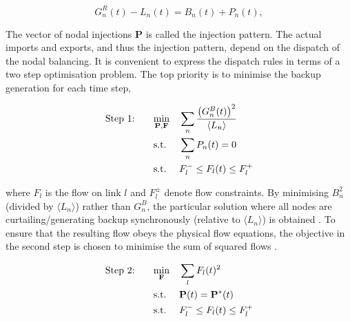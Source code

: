 \documentclass[a4paper, 5p, sort&compress]{elsarticle}%
\newcommand{\mean}[1]{\langle #1 \rangle}
\newcommand{\paren}[1]{\left(#1\right)}
\begin{document}
\begin{equation}
  \label{eq:nodal-balancing}
  G^{R}_{n}(t) - L_{n}(t) = B_{n}(t) + P_{n}(t), %
\end{equation}

The vector of nodal injections $\mathbf{P}$ is called the injection
pattern. The actual imports and exports, and thus the injection
pattern, depend on the dispatch of the nodal balancing. It is
convenient to express the dispatch rules in terms of a two step
optimisation problem. The top priority is to minimise the backup
generation for each time step,

\begin{equation}
  \label{eq:step1}
  \begin{aligned}
    \text{Step 1: \hspace{15pt}}& \underset{\mathbf{P}, \mathbf{F}}{\text{min}}
    & & \sum_{n} \frac{\paren{G_{n}^{B}(t)}^{2}}{\mean{L_{n}}} \\
    & \text{s.t.}
    & & \sum_{n} P_{n} (t) = 0 \\ %
    & \text{s.t.}
    & & F_{l}^{-} \leq F_{l} (t) \leq F_{l}^{+}
  \end{aligned}
\end{equation}

where $F_{l}$ is the flow on link $l$ and $F_{l}^{\pm}$ denote flow
constraints. By minimising $B_{n}^{2}$ (divided by $\mean{L_{n}}$)
rather than $G_{n}^{B}$, the particular solution where all nodes are
curtailing/generating backup synchronously (relative to
$\mean{L_{n}}$) is obtained
\cite{Rolando2015}. %
To ensure that the resulting flow obeys the physical flow equations, the
objective in the second step is chosen to minimise the sum of squared flows
\cite{Magnus}.

\begin{equation}
  \begin{aligned}
    \label{eq:step2}
    \text{Step 2: \hspace{15pt}} & \underset{\mathbf{F}}{\text{min}}
    & & \sum_{l} F_{l}(t)^{2} \\
    & \text{s.t.}
    & & \mathbf{P}(t) = \mathbf{P}^{*}(t) \\ %
    & \text{s.t.}
    & & F_{l}^{-} \leq F_{l}(t) \leq F_{l}^{+} \\
  \end{aligned}
\end{equation}
\end{document}
